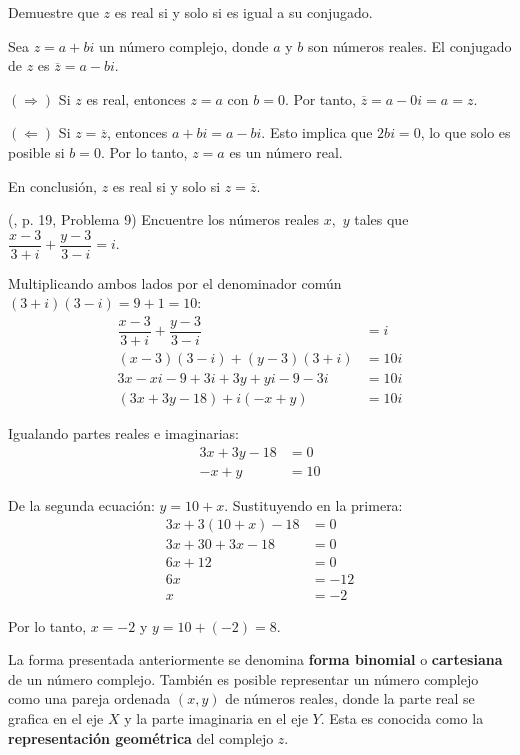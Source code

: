\begin{prob} Demuestre que $z$ es real si y solo si es igual a su conjugado.

\begin{myproof}	
Sea $z=a+bi$ un número complejo, donde $a$ y $b$ son números reales. El conjugado de $z$ es $\overline{z}=a-bi$. 

$(\Rightarrow)$ Si $z$ es real, entonces $z=a$ con $b=0$. Por tanto, $\overline{z}=a-0i=a=z$.

$(\Leftarrow)$ Si $z=\overline{z}$, entonces $a+bi=a-bi$. Esto implica que $2bi=0$, lo que solo es posible si $b=0$. Por lo tanto, $z=a$ es un número real.

En conclusión, $z$ es real si y solo si $z=\overline{z}$.
\end{myproof}
\end{prob}


\begin{prob} (\cite{andreescu2014complex}, p. 19, Problema 9) Encuentre los números reales $x,$ $y$ tales que $\dfrac{x-3}{3+i}+\dfrac{y-3}{3-i}=i.$
\begin{myproof}	
Multiplicando ambos lados por el denominador común $(3+i)(3-i)=9+1=10$:
\begin{align*}
\dfrac{x-3}{3+i}+\dfrac{y-3}{3-i}&=i\\
(x-3)(3-i)+(y-3)(3+i)&=10i\\
3x-xi-9+3i+3y+yi-9-3i&=10i\\
(3x+3y-18)+i(-x+y)&=10i
\end{align*}

Igualando partes reales e imaginarias:
\begin{align*}
3x+3y-18&=0\\
-x+y&=10
\end{align*}

De la segunda ecuación: $y=10+x$. Sustituyendo en la primera:
\begin{align*}
3x+3(10+x)-18&=0\\
3x+30+3x-18&=0\\
6x+12&=0\\
6x&=-12\\
x&=-2
\end{align*}

Por lo tanto, $\boxed{x=-2}$ y $\boxed{y=10+(-2)=8}$.
\end{myproof}
\end{prob}

La forma presentada anteriormente se denomina \textbf{forma binomial} o \textbf{cartesiana} de un número complejo. También es posible representar un número complejo como una pareja ordenada $(x,y)$ de números reales, donde la parte real se grafica en el eje $X$ y la parte imaginaria en el eje $Y$. Esta es conocida como la \textbf{representación geométrica} del complejo $z$.

